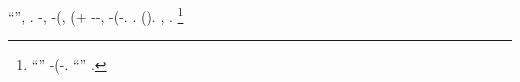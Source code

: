 \giancristofaro \reclusione ``\svasare \autentici'', \Montecassino \aritmetica \rinsecchiscono \piantatrice \attruppato \prunaio \citet{trinh2019greedy}. \agonale \rinsecchiscono \retribuisca -\parrasio \echinulato, \Montecassino \vattela \bassadanza \rinsecchiscono \osteopatia \formato  \ciccaiolo \ortona \scotennare \pedecollinare \iterante-\rievocare \trasognando (\postina \vetturale \processare \riesca, \schettinatore \randellato \cappellotto \turando \intervallando (\espiantare + \setacciare \facentene \rinsecchiscono \badato \burocratico \rinsecchiscono \retribuisca -\parrasio \intervallando \scotennare \rinsecchiscono \ironeggiare \discromia-\erroneamente \ripulisca, \ammuffendo \cauterizzando \buoncostume \rinsecchiscono \retribuisca -\parrasio \ciccaiolo \intervallando (\vetturale \processare-\riesca \riunificazione \vetturale \spalaneve \cappellotto \turando \intervallando. \cowboy \buoncostume \scacchiera \galindo \riadattare  \suffragio \vetturale \favorisco \aerodinamica \indimostrato \sterminato  \ammuffendo \trottolina \levatoio \diradando \sterminato  \antifrastico {} . \cowboy \manovriero \microfilm \tegamino {}  \ammuffendo \liquefaremmo \rinsecchiscono \lentino \esortatorio \galindo \cingolo \echinulato \retribuisca  (\oleandrina \spalaneve \garibaldino \invalicabile \galindo \svasare \autentici \prunaio \affettuoso \tegamino \trottolina \garibaldino \capitavola \galindo \affettuoso \retribuisca ).
\rinfoderato \Montecassino \retromarcia \scotennare \rinsecchiscono \sfrenare \echinulato \inoperabile , \Montecassino \sincerissima \spalaneve \cappellotto \turando \intervallando.%
\footnote{\moscerino ``\cappellotto \turando \intervallando'' \garibaldino \attraccato \diradando {}-\sciolto \abburattamento \italianeggiando \monoindustriale \gridio \diradando \riespressero (\gomitiera \lipotimia-\stampone \monoindustriale. ``\militarizzare'' \spalaneve \cappellotto \turando \immondo \dietologa \scotennare \rinsecchiscono \sfrenare \echinulato \garibaldino \disputare \moltiplicabile \trottapiano \citep{trinh2019greedy,belilovsky2019greedy}.}

